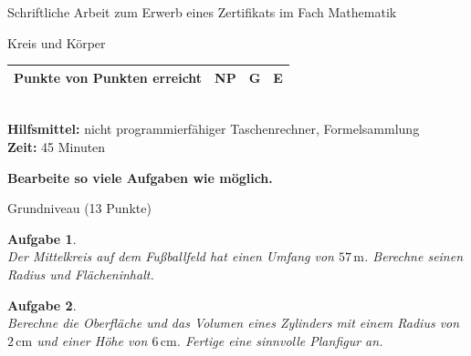 \documentclass[11pt,fleqn]{article}
\theoremstyle{aufg}
\newtheorem{aufgabe}{Aufgabe}
\theoremstyle{bsp}
\begin{document}
 
    \begin{flushleft}
\begin{center}{Schriftliche Arbeit zum Erwerb eines Zertifikats im Fach Mathematik}\end{center} 
\begin{center}{\Large Kreis und K\"orper}\end{center} 
\renewcommand{\arraystretch}{2.15} 
\begin{tabular}{|p{10cm}|p{2cm}|p{2cm}|p{2cm}|} 
\hline 
\hspace{2cm} Punkte von \qquad35\qquad Punkten erreicht & \hspace{1.2cm} NP & G & E \\ 
\hline 
\end{tabular} \\[1em]    
{\bf Hilfsmittel: }nicht programmierf\"ahiger Taschenrechner, Formelsammlung\\ 
{\bf Zeit: }45 Minuten\\ 
\begin{center} {\bf Bearbeite so viele Aufgaben wie m\"oglich.} \end{center}\begin{center} \begin{framed} Grundniveau (13 Punkte) \end{framed} \end{center}\begin{aufgabe} ~ \\ 
Der Mittelkreis auf dem Fu\ss{}ballfeld hat einen Umfang von $57\mathrm{\,m}$. Berechne seinen Radius und Fl\"acheninhalt.
\end{aufgabe} 
\begin{aufgabe} ~ \\ 
Berechne die Oberfl\"ache und das Volumen eines Zylinders mit einem Radius von $2\mathrm{\,cm}$ und einer H\"ohe von $6\mathrm{\,cm}$. Fertige eine sinnvolle Planfigur an.
\end{aufgabe} 



\end{flushleft}
\end{document}
